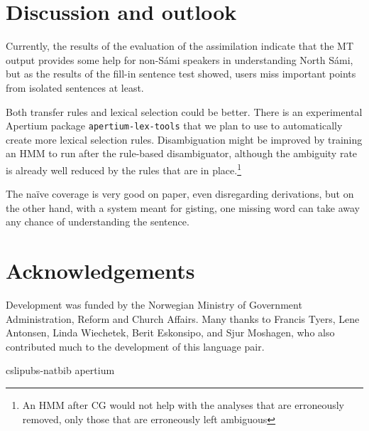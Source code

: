 \documentclass{book}
\begin{document}
\section{Discussion and outlook}
Currently, the results of the evaluation of the assimilation indicate
that the MT output provides some help for non-S\'{a}mi speakers in
understanding North S\'{a}mi, but as the results of the fill-in sentence
test showed, users miss important points from isolated sentences at
least.

Both transfer rules and lexical selection could be better. There is an
experimental Apertium package \texttt{apertium-lex-tools} that we plan
to use to automatically create more lexical selection rules.
Disambiguation might be improved by training an HMM to run after the
rule-based disambiguator, although the ambiguity rate is already well
reduced by the rules that are in place.\footnote{An HMM after CG would
  not help with the analyses that are erroneously removed, only those
  that are erroneously left ambiguous}

The na\"{i}ve coverage is very good on paper, even disregarding
derivations, but on the other hand, with a system meant for gisting,
one missing word can take away any chance of understanding the
sentence.

\section*{Acknowledgements}
Development was funded by the Norwegian Ministry of Government
Administration, Reform and Church Affairs. Many thanks to Francis
Tyers, Lene Antonsen, Linda Wiechetek, Berit Eskonsipo, and Sjur
Moshagen, who also contributed much to the development of this
language pair.                  %



 {cslipubs-natbib}
 {apertium}


\backmatter
\end{document}

